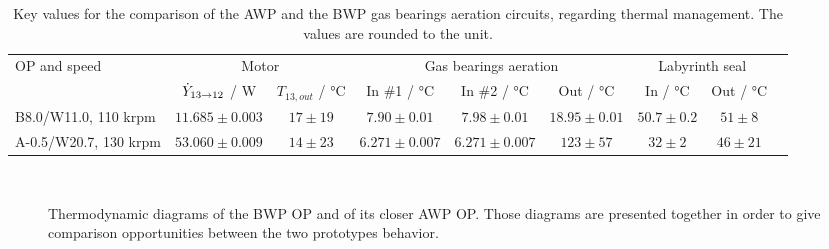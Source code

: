 \begin{table}[htbp]
  \footnotesize
  \centering
\begin{tabular}{lcccccccc}
  \toprule
  \multirow{2}{*}{OP and speed} &
  \multicolumn{2}{c}{Motor} &
  \multicolumn{3}{c}{Gas bearings aeration} &
  \multicolumn{2}{c}{Labyrinth seal}\\
  & $\dot{Y}_{13 \rightarrow 12}$ / \si{\watt} &
  $T_{13,out}$ / \si{\degreeCelsius} & In \#1 / \si{\degreeCelsius} &
  In \#2 / \si{\degreeCelsius} & Out / \si{\degreeCelsius} &
  In / \si{\degreeCelsius} & Out / \si{\degreeCelsius}\\
  \midrule
  B8.0/W11.0, 110 krpm & $\num{11.685} \pm \num{0.003}$ & $\num{17} \pm \num{19}$ & $\pmb{\num{7.90} \pm \num{0.01}}$ & $\pmb{\num{7.98} \pm \num{0.01}}$ & $\pmb{\num{18.95} \pm \num{0.01}}$ & $\num{50.7} \pm \num{0.2}$ & $\num{51} \pm \num{8}$ \\
  A-0.5/W20.7, 130 krpm & $\num{53.060} \pm \num{0.009}$ & $\num{14} \pm \num{23}$ & $\pmb{\num{6.271} \pm \num{0.007}}$ & $\pmb{\num{6.271} \pm \num{0.007}}$ & $\num{123} \pm \num{57}$ & $\num{32} \pm \num{2}$ & $\num{46} \pm \num{21}$ \\
  \bottomrule
\end{tabular}
\caption[Key values for the comparison of the AWP and the BWP gas bearings aeration circuits, regarding thermal management]{Key values for the comparison of the AWP and the BWP gas bearings aeration circuits, regarding thermal management. The values are rounded to the unit.}
\label{tab:key-values-comp-awp-bwp}
\end{table}

\begin{figure}[htbp]
  \centering
  \hspace{1em}
  \\
  \hspace{1em}
  \caption[Thermodynamic diagrams of the BWP OP and of its closer AWP
  OP]{Thermodynamic diagrams of the BWP OP and of its closer AWP
    OP. Those diagrams are presented together in order to give
    comparison opportunities between the two prototypes behavior.}
  \label{fig:bwp-B8.0/W11.0-A-0.5/W20.7-diagrams}
\end{figure}

